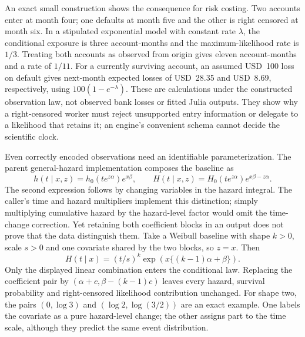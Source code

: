 An exact small construction shows the consequence for risk costing. Two
accounts enter at month four; one defaults at month five and the other is
right censored at month six. In a stipulated exponential model with constant
rate $\lambda$, the conditional exposure is three account-months and the
maximum-likelihood rate is $1/3$. Treating both accounts as observed from
origin gives eleven account-months and a rate of $1/11$. For a currently
surviving account, an assumed USD~100 loss on default gives next-month
expected losses of USD~28.35 and USD~8.69, respectively, using
$100(1-e^{-\lambda})$. These are calculations under the constructed
observation law, not observed bank losses or fitted Julia outputs. They show
why a right-censored worker must reject unsupported entry information or
delegate to a likelihood that retains it; an engine's convenient schema
cannot decide the scientific clock. \citep{rel22survwitness}

Even correctly encoded observations need an identifiable parameterization.
The parent general-hazard implementation composes the baseline as
\begin{equation}
 h(t\mid x,z)=h_0(te^{z\alpha})e^{x\beta},\qquad
 H(t\mid x,z)=H_0(te^{z\alpha})e^{x\beta-z\alpha}.
 \label{rel22:gh-composition}
\end{equation}
The second expression follows by changing variables in the hazard integral.
The caller's time and hazard multipliers implement this distinction; simply
multiplying cumulative hazard by the hazard-level factor would omit the
time-change correction. Yet retaining both coefficient blocks in an output
does not prove that the data distinguish them. Take a Weibull baseline with
shape $k>0$, scale $s>0$ and one covariate shared by the two blocks, so $z=x$.
Then
\begin{equation}
 H(t\mid x)=(t/s)^k
       \exp\!\left(x\{(k-1)\alpha+\beta\}\right).
 \label{rel22:weibull-ridge}
\end{equation}
Only the displayed linear combination enters the conditional law. Replacing
the coefficient pair by
$(\alpha+c,\beta-(k-1)c)$ leaves every hazard, survival probability and
right-censored likelihood contribution unchanged. For shape two, the pairs
$(0,\log 3)$ and $(\log 2,\log(3/2))$ are an exact example. One labels the
covariate as a pure hazard-level change; the other assigns part to the time
scale, although they predict the same event distribution.
\citep{rel22survcaller,rel22survwitness}

